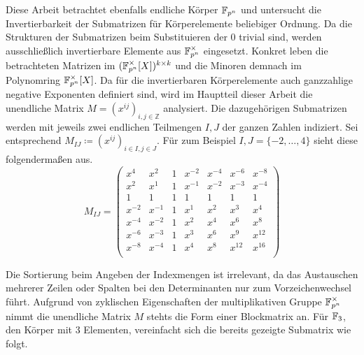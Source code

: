 Diese Arbeit betrachtet ebenfalls endliche Körper $\field{p}[n]$ und untersucht die Invertierbarkeit der Submatrizen für Körperelemente beliebiger Ordnung. Da die Strukturen der Submatrizen beim Substituieren der $0$ trivial sind, werden ausschließlich invertierbare Elemente aus $\field{p}[n]^\times$ eingesetzt. Konkret leben die betrachteten Matrizen im $(\field{p}[n]^\times [X])^{k \times k}$ und die Minoren demnach im Polynomring $\field{p}[n]^\times [X]$. Da für die invertierbaren Körperelemente auch ganzzahlige negative Exponenten definiert sind, wird im Hauptteil dieser Arbeit die unendliche Matrix $M = \left( x^{ij} \right)_{i,j \in \mathbb{Z}}$ analysiert. Die dazugehörigen Submatrizen werden mit jeweils zwei endlichen Teilmengen $I,J$ der ganzen Zahlen indiziert. Sei entsprechend $M_{IJ} \coloneqq \left( x^{ij} \right)_{i \in I,j \in J}$. Für zum Beispiel $I,J = \{-2, \dots, 4\}$ sieht diese folgendermaßen aus.
\begin{equation*}
    M_{IJ} = \begin{pmatrix}
        x^4     & x^{2} & 1    & x^{-2} & x^{-4}& x^{-6}& x^{-8}\\
        x^{2}   & x^{1} & 1    & x^{-1} & x^{-2}& x^{-3}& x^{-4}\\
        1       & 1     & 1    & 1      & 1     & 1     & 1     \\
        x^{-2}  & x^{-1}& 1    & x^{1}  & x^{2} & x^{3} & x^{4} \\
        x^{-4}  & x^{-2}& 1    & x^{2}  & x^{4} & x^{6} & x^{8} \\
        x^{-6}  & x^{-3}& 1    & x^{3}  & x^{6} & x^{9} & x^{12} \\
        x^{-8}  & x^{-4}& 1    & x^{4}  & x^{8} & x^{12} & x^{16} \\
    \end{pmatrix}
\end{equation*}

Die Sortierung beim Angeben der Indexmengen ist irrelevant, da das Austauschen mehrerer Zeilen oder Spalten bei den Determinanten nur zum Vorzeichenwechsel führt. Aufgrund von zyklischen Eigenschaften der multiplikativen Gruppe $\field{p}[n]^\times$ nimmt die unendliche Matrix $M$ stehts die Form einer Blockmatrix an. Für $\field{3}$, den Körper mit 3 Elementen, vereinfacht sich die bereits gezeigte Submatrix wie folgt.


